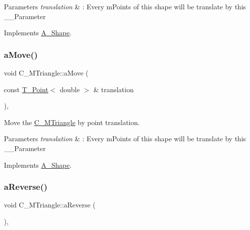 \begin{DoxyParams}{Parameters}
{\em translation} & \+: Every m\+Points of this shape will be translate by this \+\_\+\+\_\+\+Parameter \\
\hline
\end{DoxyParams}


Implements \hyperlink{classA__Shape_ab284298db1b557ccfa7ba6de7a5fee2c}{A\+\_\+\+Shape}.

\mbox{\label{classC__MTriangle_a4e185345e7e1ffd5c0b7f1f8dfdbdc59}} 
\subsubsection{\texorpdfstring{a\+Move()}{aMove()}\hspace{0.1cm}{\footnotesize\ttfamily [2/2]}}
{\footnotesize\ttfamily void C\+\_\+\+M\+Triangle\+::a\+Move (\begin{DoxyParamCaption}\item[{const \hyperlink{classT__Point}{T\+\_\+\+Point}$<$ double $>$ \&}]{translation }\end{DoxyParamCaption})\hspace{0.3cm}{\ttfamily [override]}, {\ttfamily [virtual]}}



Move the \hyperlink{classC__MTriangle}{C\+\_\+\+M\+Triangle} by point translation. 


\begin{DoxyParams}{Parameters}
{\em translation} & \+: Every m\+Points of this shape will be translate by this \+\_\+\+\_\+\+Parameter \\
\hline
\end{DoxyParams}


Implements \hyperlink{classA__Shape_ab284298db1b557ccfa7ba6de7a5fee2c}{A\+\_\+\+Shape}.

\mbox{\label{classC__MTriangle_a44614f4abb94f1a5f963cfb3e8fce7a5}} 
\subsubsection{\texorpdfstring{a\+Reverse()}{aReverse()}\hspace{0.1cm}{\footnotesize\ttfamily [1/2]}}
{\footnotesize\ttfamily void C\+\_\+\+M\+Triangle\+::a\+Reverse (\begin{DoxyParamCaption}{ }\end{DoxyParamCaption})\hspace{0.3cm}{\ttfamily [override]}, {\ttfamily [virtual]}}



